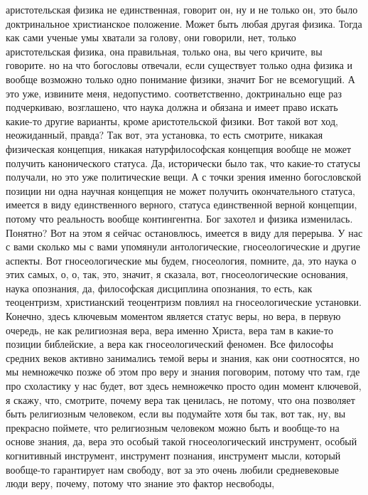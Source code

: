 аристотельская физика не единственная, говорит он, ну и не только он, это было
доктринальное христианское положение. Может быть любая другая физика. Тогда как
сами ученые умы хватали за голову, они говорили, нет, только аристотельская
физика, она правильная, только она, вы чего кричите, вы говорите. но на что
богословы отвечали, если существует только одна физика и вообще возможно только
одно понимание физики, значит Бог не всемогущий. А это уже, извините меня,
недопустимо. соответственно, доктринально еще раз подчеркиваю, возглашено, что
наука должна и обязана и имеет право искать какие-то другие варианты, кроме
аристотельской физики. Вот такой вот ход, неожиданный, правда? Так вот, эта
установка, то есть смотрите, никакая физическая концепция, никакая
натурфилософская концепция вообще не может получить канонического статуса. Да,
исторически было так, что какие-то статусы получали, но это уже политические
вещи. А с точки зрения именно богословской позиции ни одна научная концепция не
может получить окончательного статуса, имеется в виду единственного верного,
статуса единственной верной концепции, потому что реальность вообще
контингентна. Бог захотел и физика изменилась. Понятно? Вот на этом я сейчас
остановлюсь, имеется в виду для перерыва. У нас с вами сколько мы с вами
упомянули антологические, гносеологические и другие аспекты. Вот
гносеологические мы будем, гносеология, помните, да, это наука о этих самых, о,
о, так, это, значит, я сказала, вот, гносеологические основания, наука
опознания, да, философская дисциплина опознания, то есть, как теоцентризм,
христианский теоцентризм повлиял на гносеологические установки. Конечно, здесь
ключевым моментом является статус веры, но вера, в первую очередь, не как
религиозная вера, вера именно Христа, вера там в какие-то позиции библейские, а
вера как гносеологический феномен. Все философы средних веков активно занимались
темой веры и знания, как они соотносятся, но мы немножечко позже об этом про
веру и знания поговорим, потому что там, где про схоластику у нас будет, вот
здесь немножечко просто один момент ключевой, я скажу, что, смотрите, почему
вера так ценилась, не потому, что она позволяет быть религиозным человеком, если
вы подумайте хотя бы так, вот так, ну, вы прекрасно поймете, что религиозным
человеком можно быть и вообще-то на основе знания, да, вера это особый такой
гносеологический инструмент, особый когнитивный инструмент, инструмент познания,
инструмент мысли, который вообще-то гарантирует нам свободу, вот за это очень
любили средневековые люди веру, почему, потому что знание это фактор несвободы,
